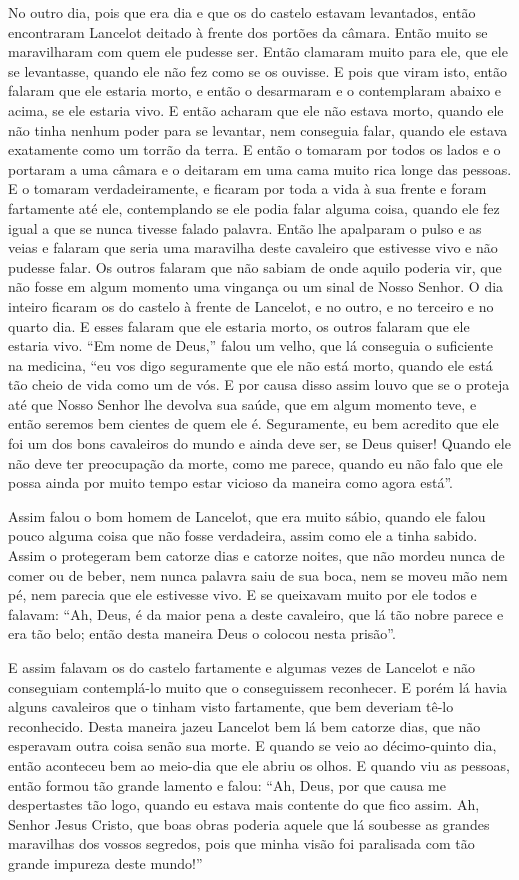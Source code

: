 No outro dia, pois que era dia e que os do castelo estavam levantados, então
encontraram Lancelot deitado à frente dos portões da câmara. Então muito se
maravilharam com quem ele pudesse ser. Então clamaram muito para ele, que ele
se levantasse, quando ele não fez como se os ouvisse. E pois que viram isto,
então falaram que ele estaria morto, e então o desarmaram e o contemplaram
abaixo e acima, se ele estaria vivo. E então acharam que ele não estava morto,
quando ele não tinha nenhum poder para se levantar, nem conseguia falar, quando
ele estava exatamente como um torrão da terra. E então o tomaram por todos os
lados e o portaram a uma câmara e o deitaram em uma cama muito rica longe das
pessoas. E o tomaram verdadeiramente, e ficaram por toda a vida à sua frente e
foram fartamente até ele, contemplando se ele podia falar alguma coisa, quando
ele fez igual a que se nunca tivesse falado palavra. Então lhe apalparam o
pulso e as veias e falaram que seria uma maravilha deste cavaleiro que
estivesse vivo e não pudesse falar. Os outros falaram que não sabiam de onde
aquilo poderia vir, que não fosse em algum momento uma vingança ou um sinal de
Nosso Senhor. O dia inteiro ficaram os do castelo à frente de
Lancelot, e no outro, e no terceiro e no quarto dia. E esses falaram que ele
estaria morto, os outros falaram que ele estaria vivo. “Em nome de Deus,” falou
um velho, que lá conseguia o suficiente na medicina, “eu vos digo seguramente
que ele não está morto, quando ele está tão cheio de vida como um de vós. E por
causa disso assim louvo que se o proteja até que Nosso Senhor lhe devolva sua
saúde, que em algum momento teve, e então seremos bem cientes de quem ele é.
Seguramente, eu bem acredito que ele foi um dos bons cavaleiros do mundo e
ainda deve ser, se Deus quiser! Quando ele não deve ter preocupação da morte,
como me parece, quando eu não falo que ele possa ainda por muito tempo estar
vicioso da maneira como agora está”. 

Assim falou o bom homem de Lancelot, que era muito sábio, quando ele falou
pouco alguma coisa que não fosse verdadeira, assim como ele a tinha sabido.
Assim o protegeram bem catorze dias e catorze noites, que não mordeu nunca de
comer ou de beber, nem nunca palavra saiu de sua boca, nem se moveu mão nem pé,
nem parecia que ele estivesse vivo. E se queixavam muito por ele todos e
falavam: “Ah, Deus, é da maior pena a deste cavaleiro, que lá tão nobre parece
e era tão belo; então desta maneira Deus o colocou nesta prisão”.

E assim falavam os do castelo fartamente e algumas vezes de Lancelot e não
conseguiam contemplá-lo muito que o conseguissem reconhecer. E porém lá havia
alguns cavaleiros que o tinham visto fartamente, que bem deveriam tê-lo
reconhecido. Desta maneira jazeu Lancelot bem lá bem catorze dias, que não
esperavam outra coisa senão sua morte. E quando se veio ao décimo-quinto dia,
então aconteceu bem ao meio-dia que ele abriu os olhos. E quando viu as
pessoas, então formou tão grande lamento e falou: “Ah, Deus, por que causa me
despertastes tão logo, quando eu estava mais contente do que fico assim. Ah,
Senhor Jesus Cristo, que boas obras poderia aquele que lá soubesse as grandes
maravilhas dos vossos segredos, pois que minha visão foi paralisada com tão
grande impureza deste mundo!”

